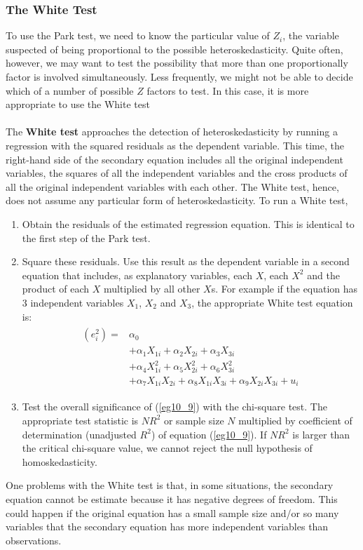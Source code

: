 \documentclass[11pt]{article}
\begin{document}
\subsubsection{The White Test}
To use the Park test, we need to know the particular value of $Z_i$, the variable suspected of being proportional to the possible heteroskedasticity. Quite often, however, we may want to test the possibility that more than one proportionally factor is involved simultaneously. Less frequently, we might not be able to decide which of a number of possible $Z$ factors to test. In this case, it is more appropriate to use the White test\\ \\
The \textbf{White test} approaches the detection of heteroskedasticity by running a regression with the squared residuals as the dependent variable. This time, the right-hand side  of the secondary equation includes all the original independent variables, the squares of all the independent variables and the cross products of all the original independent variables with each other. The White test, hence, does not assume any particular form of heteroskedasticity. To run a White test,
\begin{enumerate}
\item Obtain the residuals of the estimated regression equation. This is identical to the first step of the Park test.
\item Square these residuals. Use this result as the dependent variable in a second equation that includes, as explanatory variables, each $X$, each $X^2$ and the product of each $X$ multiplied by all other $X$s. For example if the equation has 3 independent variables $X_1$, $X_2$ and $X_3$, the appropriate White test equation is:
\begin{align}
\label{eg10_9}
\begin{split}
(e_i^2) = &\alpha_0  \\
&+\alpha_1X_{1i} + \alpha_2X_{2i} + \alpha_3X_{3i} \\ &+\alpha_4X_{1i}^2 + \alpha_5X_{2i}^2 + \alpha_6X_{3i}^2 \\
&+\alpha_7X_{1i}X_{2i} + \alpha_8X_{1i}X_{3i} + \alpha_9X_{2i}X_{3i} + u_i
\end{split}
\end{align}
\item Test the overall significance of (\ref{eg10_9}) with the chi-square test. The appropriate test statistic is $NR^2$ or sample size $N$ multiplied by coefficient of determination (unadjusted $R^2$) of equation (\ref{eg10_9}). If $NR^2$ is larger than the critical chi-square value, we cannot reject the null hypothesis of homoskedasticity.
\end{enumerate}
One problems with the White test is that, in some situations, the secondary equation cannot be estimate because it has negative degrees of freedom. This could happen if the original equation has a small sample size and/or so many variables that the secondary equation has more independent variables than observations.
\end{document}

